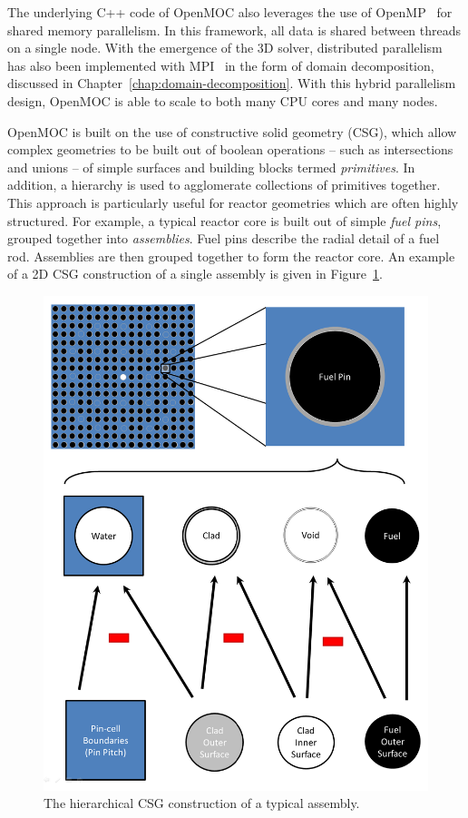 The underlying C++ code of OpenMOC also leverages the use of OpenMP~\cite{openmp} for shared memory parallelism. In this framework, all data is shared between threads on a single node. With the emergence of the 3D solver, distributed parallelism has also been implemented with MPI~\cite{mpi} in the form of domain decomposition, discussed in Chapter~\ref{chap:domain-decomposition}. With this hybrid parallelism design, OpenMOC is able to scale to both many CPU cores and many nodes. 

OpenMOC is built on the use of constructive solid geometry (CSG), which allow complex geometries to be built out of boolean operations -- such as intersections and unions -- of simple surfaces and building blocks termed \textit{primitives}. In addition, a hierarchy is used to agglomerate collections of primitives together. This approach is particularly useful for reactor geometries which are often highly structured. For example, a typical reactor core is built out of simple \textit{fuel pins}, grouped together into \textit{assemblies}. Fuel pins describe the radial detail of a fuel rod. Assemblies are then grouped together to form the reactor core. An example of a 2D CSG construction of a single assembly is given in Figure~\ref{fig:core-csg}.

\begin{figure}[h!]
	\centering
	\includegraphics[width=0.9\linewidth]{figures/assembly-csg.PNG}
	\caption[]{The hierarchical CSG construction of a typical assembly.}
	\label{fig:core-csg}
\end{figure}

